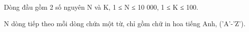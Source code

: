 Dòng đầu gồm 2 số nguyên N và K, 1 ≤ N ≤ 10 000, 1 ≤ K ≤ 100.   


   N dòng tiếp theo mỗi dòng chứa một từ, chỉ gồm chữ in hoa tiếng Anh, ('A'-'Z').